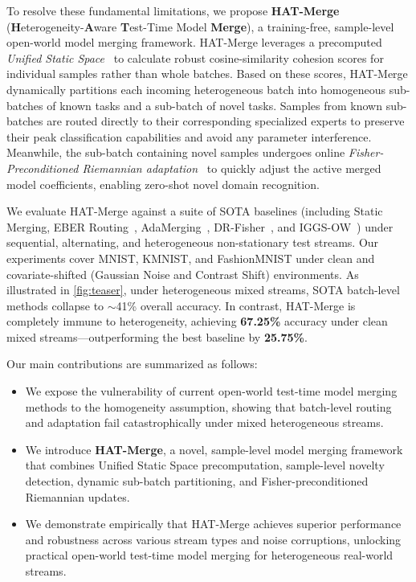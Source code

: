 \documentclass{article}
\theoremstyle{plain}
\theoremstyle{definition}
\theoremstyle{remark}
\begin{document}
To resolve these fundamental limitations, we propose \textbf{HAT-Merge} (\textbf{H}eterogeneity-\textbf{A}ware \textbf{T}est-Time Model \textbf{Merge}), a training-free, sample-level open-world model merging framework. HAT-Merge leverages a precomputed \textit{Unified Static Space}~\cite{iggs_ow} to calculate robust cosine-similarity cohesion scores for individual samples rather than whole batches. Based on these scores, HAT-Merge dynamically partitions each incoming heterogeneous batch into homogeneous sub-batches of known tasks and a sub-batch of novel tasks. Samples from known sub-batches are routed directly to their corresponding specialized experts to preserve their peak classification capabilities and avoid any parameter interference. Meanwhile, the sub-batch containing novel samples undergoes online \textit{Fisher-Preconditioned Riemannian adaptation}~\cite{dr_fisher, riemannian_opt} to quickly adjust the active merged model coefficients, enabling zero-shot novel domain recognition.

We evaluate HAT-Merge against a suite of SOTA baselines (including Static Merging, EBER Routing~\cite{eber}, AdaMerging~\cite{adamerging}, DR-Fisher~\cite{dr_fisher}, and IGGS-OW~\cite{iggs_ow}) under sequential, alternating, and heterogeneous non-stationary test streams. Our experiments cover MNIST, KMNIST, and FashionMNIST under clean and covariate-shifted (Gaussian Noise and Contrast Shift) environments. As illustrated in \cref{fig:teaser}, under heterogeneous mixed streams, SOTA batch-level methods collapse to $\sim$41\% overall accuracy. In contrast, HAT-Merge is completely immune to heterogeneity, achieving \textbf{67.25\%} accuracy under clean mixed streams—outperforming the best baseline by \textbf{25.75\%}.

Our main contributions are summarized as follows:
\begin{itemize}
    \item We expose the vulnerability of current open-world test-time model merging methods to the homogeneity assumption, showing that batch-level routing and adaptation fail catastrophically under mixed heterogeneous streams.
    \item We introduce \textbf{HAT-Merge}, a novel, sample-level model merging framework that combines Unified Static Space precomputation, sample-level novelty detection, dynamic sub-batch partitioning, and Fisher-preconditioned Riemannian updates.
    \item We demonstrate empirically that HAT-Merge achieves superior performance and robustness across various stream types and noise corruptions, unlocking practical open-world test-time model merging for heterogeneous real-world streams.
\end{itemize}
\end{document}
